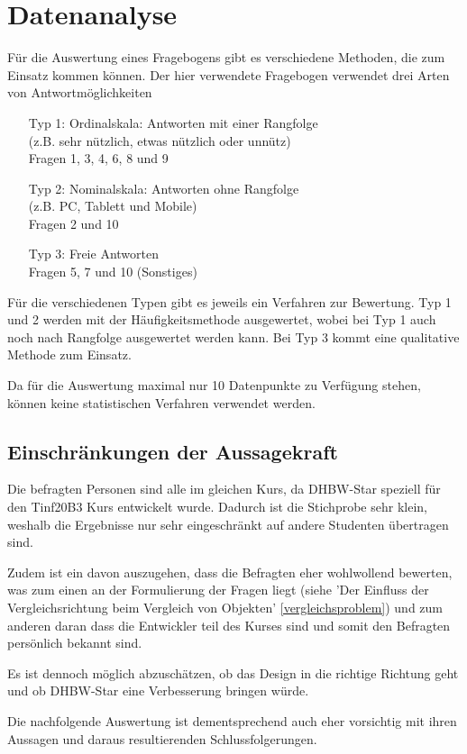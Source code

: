 \chapter{Datenanalyse}
Für die Auswertung eines Fragebogens gibt es verschiedene Methoden, die zum Einsatz kommen können. Der hier verwendete Fragebogen verwendet drei Arten von Antwortmöglichkeiten
\begin{itemize}
	\item[Typ 1:] {Ordinalskala: Antworten mit einer Rangfolge \\
		(z.B. sehr nützlich, etwas nützlich oder unnütz) \\
		Fragen 1, 3, 4, 6, 8 und 9}
	\item[Typ 2:] {Nominalskala: Antworten ohne Rangfolge \\
		(z.B. PC, Tablett und Mobile) \\
		Fragen 2 und 10}
	\item[Typ 3:] {Freie Antworten \\
		Fragen 5, 7 und 10 (Sonstiges) }
\end{itemize}
Für die verschiedenen Typen gibt es jeweils ein Verfahren zur Bewertung.
Typ 1 und 2 werden mit der Häufigkeitsmethode ausgewertet, wobei bei Typ 1 auch noch nach Rangfolge ausgewertet werden kann. Bei Typ 3 kommt eine qualitative Methode zum Einsatz.

Da für die Auswertung maximal nur 10 Datenpunkte zu Verfügung stehen, können keine statistischen Verfahren verwendet werden.
\newpage
\section{Einschränkungen der Aussagekraft }
Die befragten Personen sind alle im gleichen Kurs, da DHBW-Star speziell für den Tinf20B3 Kurs entwickelt wurde. Dadurch ist die Stichprobe sehr klein, weshalb die Ergebnisse nur sehr eingeschränkt auf andere Studenten übertragen sind.

Zudem ist ein davon auszugehen, dass die Befragten eher wohlwollend bewerten, was zum einen an der Formulierung der Fragen liegt (siehe 'Der Einfluss der Vergleichsrichtung beim Vergleich von Objekten' \ref{vergleichsproblem}) und zum anderen daran dass die Entwickler teil des Kurses sind und somit den Befragten persönlich bekannt sind.

Es ist dennoch möglich abzuschätzen, ob das Design in die richtige Richtung geht und ob DHBW-Star eine Verbesserung bringen würde.

Die nachfolgende Auswertung ist dementsprechend auch eher vorsichtig mit ihren Aussagen und daraus resultierenden Schlussfolgerungen.


